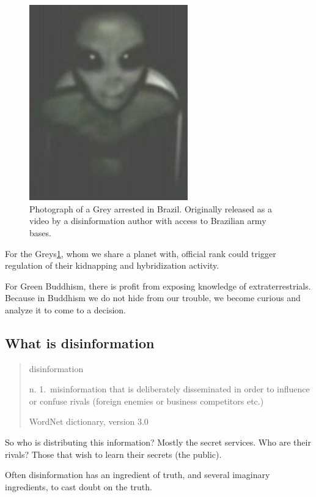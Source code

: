 \documentclass{report}
\begin{document}
\begin{figure}
  \centering
  \includegraphics[width=0.61\textwidth]{photograph/gray-alien-upper-body.jpg}
  \caption{Photograph of a Grey arrested in Brazil. Originally released as a video by a
disinformation author with access to Brazilian army bases.}\label{fig:grey}
\end{figure}

For the Greys\ref{fig:grey}, whom we share a planet with, official rank could trigger
regulation of their kidnapping and hybridization activity. 

For Green Buddhism, there is profit from exposing knowledge of
extraterrestrials. Because in Buddhism we do not hide from our trouble, we
become curious and analyze it to come to a decision.

\subsection{What is disinformation}\label{disinformation}

\blockquote[WordNet dictionary, version 3.0]{disinformation

n. 1.\  misinformation that is deliberately disseminated in order to influence or
confuse rivals (foreign enemies or business competitors etc.)}

So who is distributing this information? Mostly the secret services.
Who are their rivals? Those that wish to learn their secrets (the public).

Often disinformation has an ingredient of truth, and several imaginary
ingredients, to cast doubt on the truth.
\end{document}
